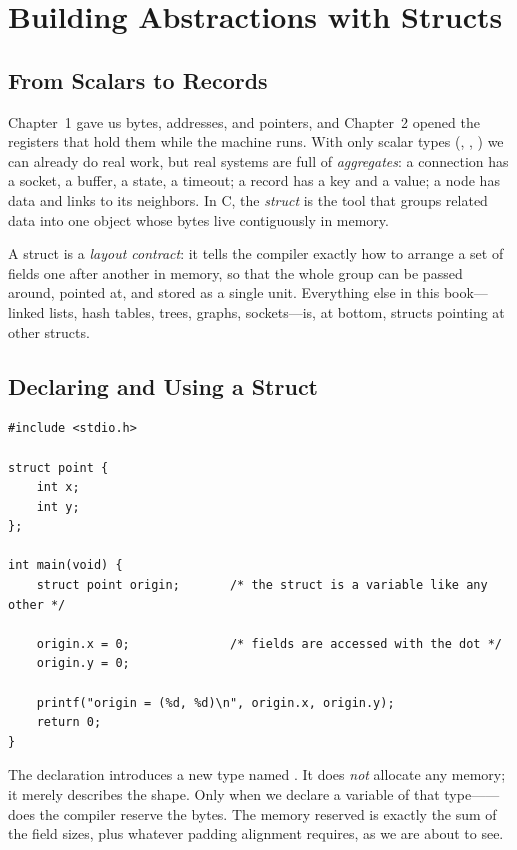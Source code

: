 
\chapter{Building Abstractions with Structs}

\section{From Scalars to Records}

Chapter~1 gave us bytes, addresses, and pointers, and Chapter~2
opened the registers that hold them while the machine runs. With only
scalar
types (, , ) we can already do real
work, but real systems are full of \emph{aggregates}: a connection has
a socket, a buffer, a state, a timeout; a record has a key and a
value; a node has data and links to its neighbors. In C, the
\emph{struct} is the tool that groups related data into one object
whose bytes live contiguously in memory.

A struct is a \emph{layout contract}: it tells the compiler exactly how
to arrange a set of fields one after another in memory, so that the
whole group can be passed around, pointed at, and stored as a single
unit. Everything else in this book---linked lists, hash tables, trees,
graphs, sockets---is, at bottom, structs pointing at other structs.

\section{Declaring and Using a Struct}

\begin{lstlisting}[caption={A minimal struct: a 2D point.}]
#include <stdio.h>

struct point {
    int x;
    int y;
};

int main(void) {
    struct point origin;       /* the struct is a variable like any other */

    origin.x = 0;              /* fields are accessed with the dot */
    origin.y = 0;

    printf("origin = (%d, %d)\n", origin.x, origin.y);
    return 0;
}
\end{lstlisting}

The declaration  introduces a
new type named . It does \emph{not} allocate any
memory; it merely describes the shape. Only when we declare a variable
of that type------does the compiler reserve
the bytes. The memory reserved is exactly the sum of the field sizes,
plus whatever padding alignment requires, as we are about to see.

